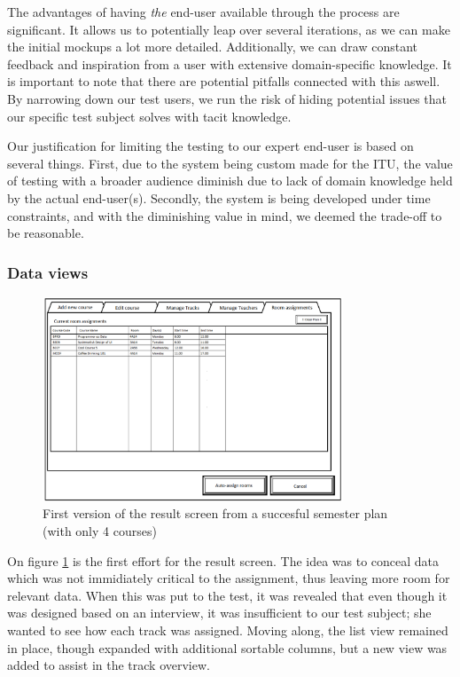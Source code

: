 The advantages of having \emph{the} end-user available through the process are significant. It allows us to potentially leap over several iterations, as we can make the initial mockups a lot more detailed. Additionally, we can draw constant feedback and inspiration from a user with extensive domain-specific knowledge.
It is important to note that there are potential pitfalls connected with this aswell. By narrowing down our test users, we run the risk of hiding potential issues that our specific test subject solves with tacit knowledge.


Our justification for limiting the testing to our expert end-user is based on several things. First, due to the system being custom made for the ITU, the value of testing with a broader audience diminish due to lack of domain knowledge held by the actual end-user(s). Secondly, the system is being developed under time constraints, and with the diminishing value in mind, we deemed the trade-off to be reasonable. 

\subsubsection{Data views}
\begin{figure}[htb]
\begin{center}
\leavevmode
\includegraphics[width=0.8\textwidth]{images/sem1_room_assignments}
\end{center}
\caption{First version of the result screen from a succesful semester plan (with only 4 courses)}
\label{fig:sem1_room_ass}
\end{figure}

On figure \ref{fig:sem1_room_ass} is the first effort for the result screen. The idea was to conceal data which was not immidiately critical to the assignment, thus leaving more room for relevant data.
When this was put to the test, it was revealed that even though it was designed based on an interview, it was insufficient to our test subject; she wanted to see how each track was assigned.
Moving along, the list view remained in place, though expanded with additional sortable columns, but a new view was added to assist in the track overview.

